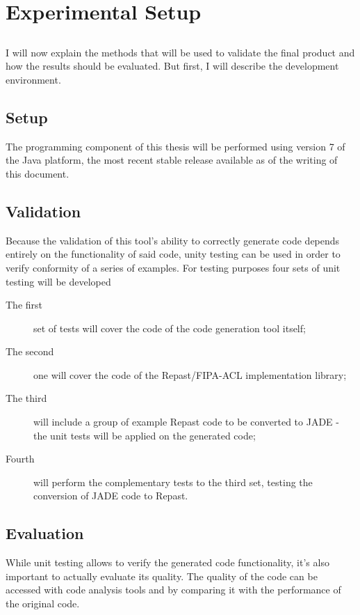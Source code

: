 \chapter{Experimental Setup} \label{chap:validation}

\section*{}

I will now explain the methods that will be used to validate the final product and how the results should be evaluated. But first, I will describe the development environment.

\section{Setup}

The programming component of this thesis will be performed using version 7 of the Java platform, the most recent stable release available as of the writing of this document. 

\section{Validation}

Because the validation of this tool's ability to correctly generate code depends entirely on the functionality of said code, unity testing can be used in order to verify conformity of a series of examples. For testing purposes four sets of unit testing will be developed

\begin{description}
  \item[The first] set of tests will cover the code of the code generation tool itself;
  \item[The second] one will cover the code of the Repast/FIPA-ACL implementation library;
  \item[The third] will include a group of example Repast code to be converted to JADE - the unit tests will be applied on the generated code;
  \item[Fourth] will perform the complementary tests to the third set, testing the conversion of JADE code to Repast.
\end{description}


\section{Evaluation}
While unit testing allows to verify the generated code functionality, it's also important to actually evaluate its quality. The quality of the code can be accessed with code analysis tools and by comparing it with the performance of the original code.
